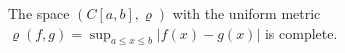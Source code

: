 The space $(C[a,b], \varrho)$ with the uniform metric $\varrho(f,g) = \sup_{a \leq x \leq b} |f(x) - g(x)|$ is complete.
